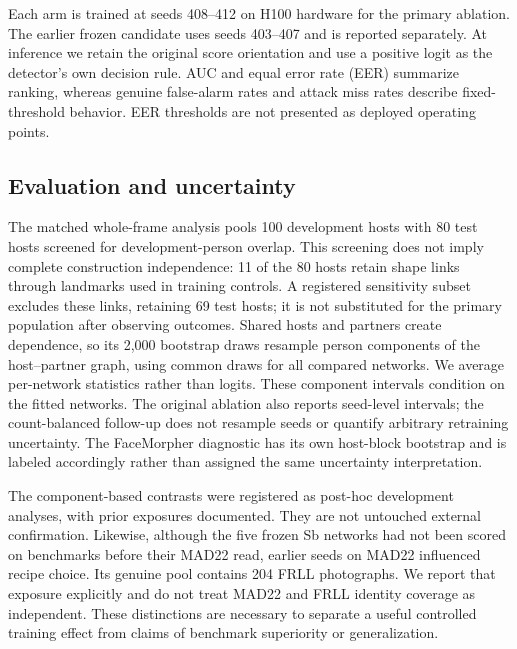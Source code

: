 Each arm is trained at seeds 408--412 on H100 hardware for the primary ablation. The earlier frozen candidate uses seeds 403--407 and is reported separately. At inference we retain the original score orientation and use a positive logit as the detector's own decision rule. AUC and equal error rate (EER) summarize ranking, whereas genuine false-alarm rates and attack miss rates describe fixed-threshold behavior. EER thresholds are not presented as deployed operating points.

\subsection{Evaluation and uncertainty}
The matched whole-frame analysis pools 100 development hosts with 80 test hosts screened for development-person overlap. This screening does not imply complete construction independence: 11 of the 80 hosts retain shape links through landmarks used in training controls. A registered sensitivity subset excludes these links, retaining 69 test hosts; it is not substituted for the primary population after observing outcomes. Shared hosts and partners create dependence, so its 2,000 bootstrap draws resample person components of the host--partner graph, using common draws for all compared networks. We average per-network statistics rather than logits. These component intervals condition on the fitted networks. The original ablation also reports seed-level intervals; the count-balanced follow-up does not resample seeds or quantify arbitrary retraining uncertainty. The FaceMorpher diagnostic has its own host-block bootstrap and is labeled accordingly rather than assigned the same uncertainty interpretation.

The component-based contrasts were registered as post-hoc development analyses, with prior exposures documented. They are not untouched external confirmation. Likewise, although the five frozen Sb networks had not been scored on benchmarks before their MAD22 read, earlier seeds on MAD22 influenced recipe choice. Its genuine pool contains 204 FRLL photographs. We report that exposure explicitly and do not treat MAD22 and FRLL identity coverage as independent. These distinctions are necessary to separate a useful controlled training effect from claims of benchmark superiority or generalization.
